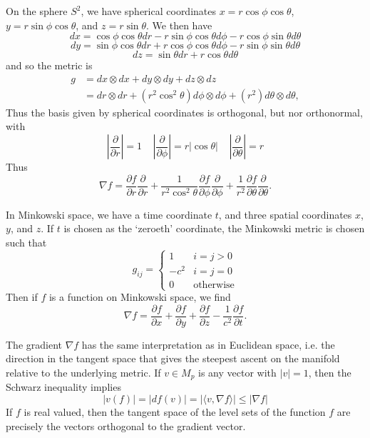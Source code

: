 \begin{example}
    On the sphere $S^2$, we have spherical coordinates $x = r \cos \phi \cos \theta$, $y = r \sin \phi \cos \theta$, and $z = r \sin \theta$. We then have
    \[ dx = \cos \phi \cos \theta dr - r \sin \phi \cos \theta d \phi - r \cos \phi \sin \theta d\theta \]
    \[ dy = \sin \phi \cos \theta dr + r \cos \phi \cos \theta d \phi - r \sin \phi \sin \theta d \theta \]
    \[ dz = \sin \theta dr + r \cos \theta d \theta \]
    and so the metric is
    \begin{align*}
        g &= dx \otimes dx + dy \otimes dy + dz \otimes dz\\
        &= dr \otimes dr + (r^2 \cos^2 \theta) d\phi \otimes d\phi + (r^2) d\theta \otimes d\theta,
    \end{align*}
    Thus the basis given by spherical coordinates is orthogonal, but nor orthonormal, with
    \[ \left|\frac{\partial}{\partial r} \right| = 1\ \ \ \ \ \left|\frac{\partial}{\partial \phi}\right| = r |\cos \theta|\ \ \ \ \ \left|\frac{\partial}{\partial \theta}\right| = r \]
    Thus
    \[ \nabla f = \frac{\partial f}{\partial r} \frac{\partial}{\partial r} + \frac{1}{r^2 \cos^2 \theta} \frac{\partial f}{\partial \phi} \frac{\partial}{\partial \phi} + \frac{1}{r^2} \frac{\partial f}{\partial \theta} \frac{\partial}{\partial \theta}. \]
\end{example}

\begin{example}
    In Minkowski space, we have a time coordinate $t$, and three spatial coordinates $x$, $y$, and $z$. If $t$ is chosen as the `zeroeth' coordinate, the Minkowski metric is chosen such that
    \[ g_{ij} = \begin{cases} 1 & i = j > 0 \\ -c^2 & i = j = 0 \\ 0 & \text{otherwise} \end{cases} \]
    Then if $f$ is a function on Minkowski space, we find
    \[ \nabla f = \frac{\partial f}{\partial x} + \frac{\partial f}{\partial y} + \frac{\partial f}{\partial z} - \frac{1}{c^2} \frac{\partial f}{\partial t}. \]
\end{example}

The gradient $\nabla f$ has the same interpretation as in Euclidean space, i.e. the direction in the tangent space that gives the steepest ascent on the manifold relative to the underlying metric. If $v \in M_p$ is any vector with $|v| = 1$, then the Schwarz inequality implies
%
\[ |v(f)| = |df(v)| = |\langle v, \nabla f \rangle| \leq |\nabla f| \]
%
If $f$ is real valued, then the tangent space of the level sets of the function $f$ are precisely the vectors orthogonal to the gradient vector.

